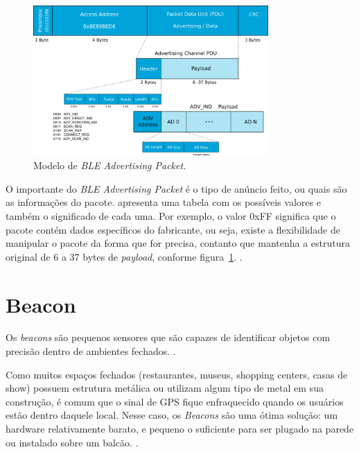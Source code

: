 \begin{figure}[htb]
	\caption{\label{fig:ble-adv-packet}Modelo de \textit{BLE Advertising Packet}.}
	\begin{center}
		\includegraphics[width=0.8\textwidth]{img/ble-adv-packet.png}
	\end{center}
\end{figure}

O importante do \textit{BLE Advertising Packet} é o tipo de anúncio feito, ou quais são as informações do pacote.  apresenta uma tabela com os possíveis valores e também o significado de cada uma. Por exemplo, o valor 0xFF significa que o pacote contém dados específicos do fabricante, ou seja, existe a flexibilidade de manipular o pacote da forma que for precisa, contanto que mantenha a estrutura original de 6 a 37 bytes de \textit{payload}, conforme figura~\ref{fig:ble-adv-packet}. \cite{ble-packets}.

\section{Beacon}\label{sec:beacon}

Os \textit{beacons} são pequenos sensores que são capazes de identificar objetos com precisão dentro de ambientes fechados. \cite{teixeira-beacon}.

\begin{citacao}
Como muitos espaços fechados (restaurantes, museus, shopping centers, casas de show) possuem estrutura metálica ou utilizam algum tipo de metal em sua construção, é comum que o sinal de GPS fique enfraquecido quando os usuários estão dentro daquele local. Nesse caso, os \textit{Beacons} são uma ótima solução: um hardware relativamente barato, e pequeno o suficiente para ser plugado na parede ou instalado sobre um balcão. \cite{teixeira-beacon}.
\end{citacao}


